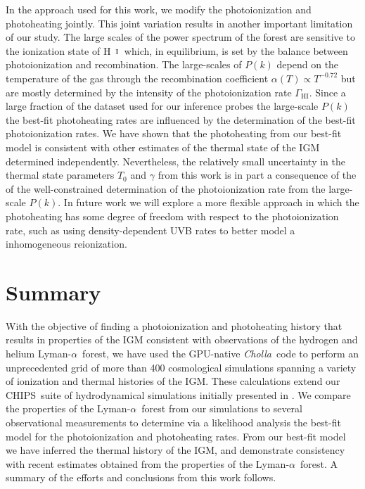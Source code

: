 \documentclass[twocolumn]{aastex62}
\newcommand\Cholla{\emph{Cholla}~}
\newcommand\Lya{Lyman-$\alpha$}
\newcommand\Sim{CHIPS~}
\def\HI{\hbox{\rm H~$\scriptstyle\rm I$}}
\begin{document}
In the approach used for this work, we modify the photoionization and photoheating jointly.
This joint variation results in another important limitation of our study. The large scales of the power spectrum of the 
forest are sensitive to the ionization state of \HI\ which, in equilibrium, is set by the balance between 
photoionization and recombination. The large-scales of $P(k)$ depend on the temperature of the gas
through the recombination coefficient $\alpha(T) \propto T^{-0.72}$ but are mostly determined by the intensity of the
photoionization rate $\Gamma_\mathrm{HI}$. Since a large fraction of the dataset used for our inference probes the
large-scale $P(k)$ the best-fit photoheating rates are influenced by the determination of the best-fit photoionization 
rates. We have shown that the photoheating from our best-fit model is consistent with other estimates of the 
thermal state of the IGM determined independently.
Nevertheless, the relatively small uncertainty in the thermal state parameters $T_0$ and $\gamma$ from this work is in part 
a consequence of the
of the well-constrained determination of the photoionization rate from the large-scale $P(k)$. In future work we will explore 
a more flexible approach in which the photoheating has some degree of freedom with respect to the photoionization rate, such
as using density-dependent UVB rates to better model a inhomogeneous reionization.                 
        



\section{Summary}
\label{sec:summary}

With the objective of finding a photoionization and photoheating history that results in properties of the IGM consistent with
observations of the hydrogen and helium  \Lya\ forest,
we have used the  GPU-native \Cholla code to perform an unprecedented grid of more than 400 cosmological simulations
spanning a variety of ionization and thermal histories of the IGM. 
These calculations extend our \Sim suite of hydrodynamical simulations initially presented 
in \cite{villasenor2021a}. 
We compare the properties of the \Lya\ forest from our 
simulations to several observational measurements to determine via a likelihood
analysis the best-fit model for the photoionization and photoheating rates.
From our best-fit model we have inferred the thermal history of the IGM, and
demonstrate consistency with recent estimates obtained from the properties of the \Lya\ forest.
A summary of the efforts and conclusions from this work follows.
\end{document}

